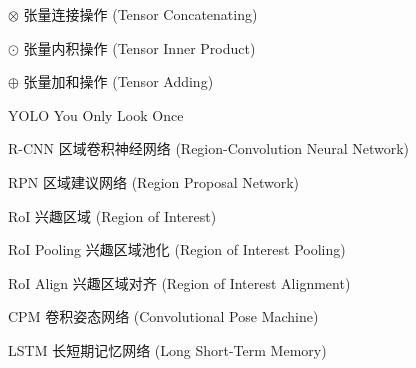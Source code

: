 \begin{denotation}[3cm]
\item[$\otimes$] 张量连接操作 (Tensor Concatenating)
\item[$\odot$] 张量内积操作 (Tensor Inner Product)
\item[$\oplus$] 张量加和操作 (Tensor Adding)
\item[YOLO] You Only Look Once\cite{redmon2016you}
\item[R-CNN] 区域卷积神经网络 (Region-Convolution Neural Network)
\item[RPN] 区域建议网络 (Region Proposal Network)
\item[RoI] 兴趣区域 (Region of Interest)
\item[RoI Pooling] 兴趣区域池化 (Region of Interest Pooling)
\item[RoI Align] 兴趣区域对齐 (Region of Interest Alignment)
\item[CPM] 卷积姿态网络 (Convolutional Pose Machine)
\item[LSTM] 长短期记忆网络 (Long Short-Term Memory)
\end{denotation}
